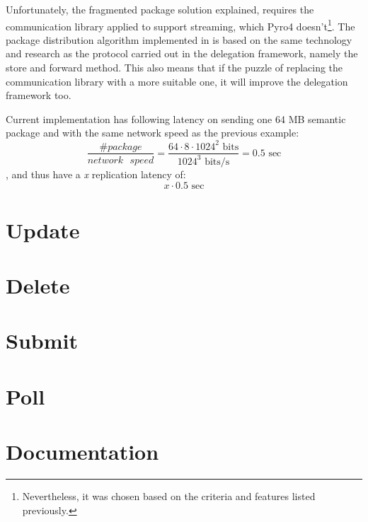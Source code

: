 \noindent
Unfortunately, the fragmented package solution explained, requires the communication library applied to support streaming, which Pyro4 doesn't\footnote{Nevertheless, it was chosen based on the criteria and features listed previously.}. The package distribution algorithm implemented in \CodeName is based on the same technology and research as the protocol carried out in the delegation framework, namely the store and forward method. This also means that if the puzzle of replacing the communication library with a more suitable one, it will improve the delegation framework too.
\newline

Current implementation has following latency on sending one 64 MB semantic package and with the same network speed as the previous example:
\begin{equation}
	\dfrac{\texttt{\#}package}{network\text{ }speed} = \dfrac{64\cdot 8\cdot 1024^2 \text{ bits}}{1024^3 \text{ bits/s}} = 0.5 \text{ sec}
\end{equation}
, and thus have a \textit{x} replication latency of:
\begin{equation}
	x \cdot 0.5 \text{ sec}
\end{equation}
 
\section{Update}

\section{Delete}

\section{Submit} \label{sec:submit}

\section{Poll}

\section{Documentation}